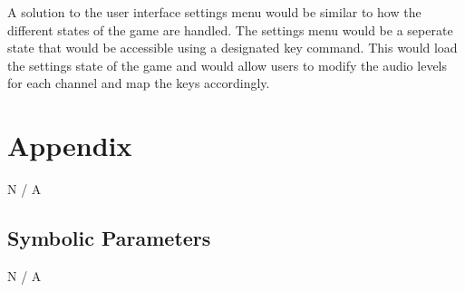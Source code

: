 \documentclass[12pt, titlepage]{article}
\begin{document}
{\color{blue} A solution to the user interface settings menu would be similar to how the different states of the game are handled. The settings menu would be a seperate state that would be accessible using a designated key command. This would load the settings state of the game and would allow users to modify the audio levels for each channel and map the keys accordingly.}






\newpage

\section{Appendix}

N / A

\subsection{Symbolic Parameters}

N / A
\end{document}

